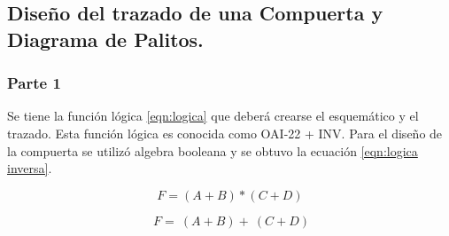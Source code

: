 \documentclass[12pt,a4paper]{article} %
\begin{document}
\subsection{Diseño del trazado de una Compuerta y Diagrama de Palitos.}


\subsubsection{Parte 1}

Se tiene la función lógica \ref{eqn:logica} que deberá crearse el esquemático y el trazado. Esta función lógica es conocida como OAI-22 + INV. Para el diseño de la compuerta se utilizó algebra booleana y se obtuvo la ecuación \ref{eqn:logica inversa}.

\begin{equation}\label{eqn:logica}
F=(A+B)*(C+D)
\end{equation}

\begin{equation}\label{eqn:logica inversa}
~F=~(A+B)+~(C+D)
\end{equation}
\end{document}
